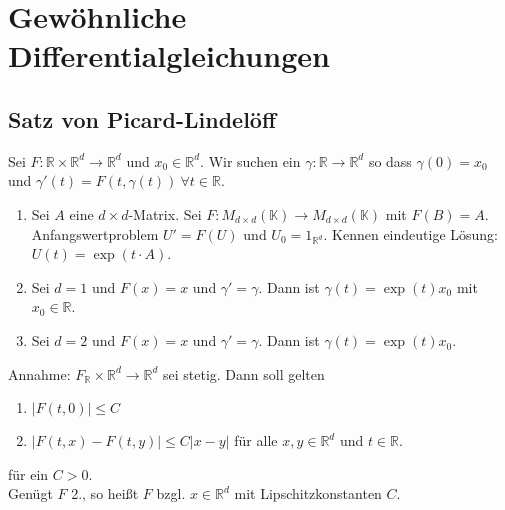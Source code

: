 \documentclass[11pt,twoside]{memoir}
\begin{document}
	
\frontmatter
\maketitle
\begin{KeepFromToc}
	\tableofcontents
\end{KeepFromToc}

\mainmatter
\chapter{Gewöhnliche Differentialgleichungen}
\section{Satz von Picard-Lindelöff}
Sei $F: \mathbb{R}\times \mathbb{R}^d \to \mathbb{R}^d$ und $x_0 \in \mathbb{R}^d$. Wir suchen ein $\gamma: \mathbb{R}\to \mathbb{R}^d$ so dass $\gamma(0) = x_0$ und $\gamma'(t) = F(t,\gamma(t))~\forall t\in \mathbb{R}$.

\begin{bsp}
	\begin{enumerate}
		\item Sei $A$ eine $d\times d$-Matrix. Sei $F: M_{d\times d}(\mathbb{K}) \to M_{d\times d}(\mathbb{K})$ mit $F(B) = A$. Anfangswertproblem $U'= F(U)$ und $U_0 = 1_{\mathbb{R}^d}$. Kennen eindeutige Lösung: $U(t) = \exp(t\cdot A)$.
		\item Sei $d = 1$ und $F(x) = x$ und $\gamma' = \gamma$. Dann ist $\gamma(t) = \exp(t)x_0$ mit $x_0 \in \mathbb{R}$.
		\item Sei $d = 2$ und $F(x) = x$ und $\gamma' = \gamma$. Dann ist $\gamma(t) = \exp(t)x_0$.
	\end{enumerate}
\end{bsp}
Annahme: $F _\mathbb{R}\times \mathbb{R}^d\to \mathbb{R}^d$ sei stetig. Dann soll gelten
\begin{enumerate}
	\item $|F(t,0)|\leq C$
	\item $|F(t,x) - F(t,y)| \leq C |x-y|$ für alle $x,y\in \mathbb{R}^d$ und $t\in \mathbb{R}$.
\end{enumerate}
für ein $C > 0$.\\
Genügt $F$ 2., so heißt $F$  bzgl. $x\in \mathbb{R}^d$ mit Lipschitzkonstanten $C$.
\end{document}
